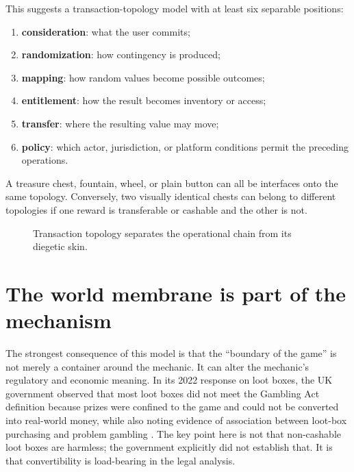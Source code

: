 \documentclass[11pt]{article}
\begin{document}
This suggests a transaction-topology model with at least six separable positions:
\begin{enumerate}[nosep]
\item \textbf{consideration}: what the user commits;
\item \textbf{randomization}: how contingency is produced;
\item \textbf{mapping}: how random values become possible outcomes;
\item \textbf{entitlement}: how the result becomes inventory or access;
\item \textbf{transfer}: where the resulting value may move;
\item \textbf{policy}: which actor, jurisdiction, or platform conditions permit the preceding operations.
\end{enumerate}
A treasure chest, fountain, wheel, or plain button can all be interfaces onto the same topology. Conversely, two visually identical chests can belong to different topologies if one reward is transferable or cashable and the other is not.

\begin{figure}[ht]
\centering
{}
\caption{Transaction topology separates the operational chain from its diegetic skin.}
\end{figure}

\section{The world membrane is part of the mechanism}
The strongest consequence of this model is that the ``boundary of the game'' is not merely a container around the mechanic. It can alter the mechanic's regulatory and economic meaning. In its 2022 response on loot boxes, the UK government observed that most loot boxes did not meet the Gambling Act definition because prizes were confined to the game and could not be converted into real-world money, while also noting evidence of association between loot-box purchasing and problem gambling \parencite{dcms2022lootboxes}. The key point here is not that non-cashable loot boxes are harmless; the government explicitly did not establish that. It is that convertibility is load-bearing in the legal analysis.
\end{document}
